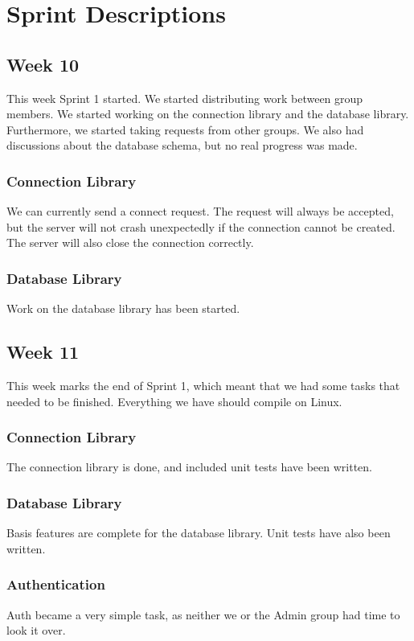 \section*{Sprint Descriptions}
\subsection*{Week 10}
This week Sprint 1 started. We started distributing work between group members. We started working on the connection library and the database library. Furthermore, we started taking requests from other groups. We also had discussions about the database schema, but no real progress was made.


\subsubsection*{Connection Library}
We can currently send a connect request. The request will always be accepted, but the server will not crash unexpectedly if the connection cannot be created. The server will also close the connection correctly.


\subsubsection*{Database Library}
Work on the database library has been started.


\subsection*{Week 11}
This week marks the end of Sprint 1, which meant that we had some tasks that needed to be finished. Everything we have should compile on Linux.


\subsubsection*{Connection Library}
The connection library is done, and included unit tests have been written.


\subsubsection*{Database Library}
Basis features are complete for the database library. Unit tests have also been written.


\subsubsection*{Authentication}
Auth became a very simple task, as neither we or the Admin group had time to look it over.


